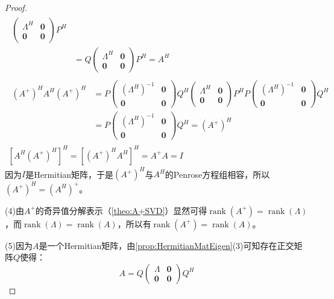 \begin{proof}
\begin{gather*}
\begin{aligned}
\begin{pmatrix}
				\varLambda^H & \mathbf{0} \\
				\mathbf{0} & \mathbf{0}
			\end{pmatrix}
			P^H \\
			&=Q
			\begin{pmatrix}
				\varLambda^H & \mathbf{0} \\
				\mathbf{0} & \mathbf{0}
			\end{pmatrix}
			P^H
			=A^H
		\end{aligned} \\
		\begin{aligned}
			(A^+)^HA^H(A^+)^H
			&=P
			\begin{pmatrix}
				(\varLambda^H)^{-1} & \mathbf{0} \\
				\mathbf{0} & \mathbf{0}
			\end{pmatrix}
			Q^H\begin{pmatrix}
				\varLambda^H & \mathbf{0} \\
				\mathbf{0} & \mathbf{0}
			\end{pmatrix}
			P^HP
			\begin{pmatrix}
				(\varLambda^H)^{-1} & \mathbf{0} \\
				\mathbf{0} & \mathbf{0}
			\end{pmatrix}Q^H \\
			&=P
			\begin{pmatrix}
				(\varLambda^H)^{-1} & \mathbf{0} \\
				\mathbf{0} & \mathbf{0}
			\end{pmatrix}Q^H
			=(A^+)^H
		\end{aligned} \\
		[A^H(A^+)^H]^H=[(A^+)^HA^H]^H=A^+A=I
	\end{gather*}
	因为$I$是Hermitian矩阵，于是$(A^+)^H$与$A^H$的Penrose方程组相容，所以$(A^+)^H=(A^H)^+$。\par
	(4)由$A^+$的奇异值分解表示（\cref{theo:A+SVD}）显然可得$\operatorname{rank}(A^+)=\operatorname{rank}(\varLambda)$，而$\operatorname{rank}(\varLambda)=\operatorname{rank}(A)$，所以有$\operatorname{rank}(A^+)=\operatorname{rank}(A)$。\par
	(5)因为$A$是一个Hermitian矩阵，由\cref{prop:HermitianMatEigen}(3)可知存在正交矩阵$Q$使得：
	\begin{equation*}
		A=Q
		\begin{pmatrix}
			\varLambda & \mathbf{0} \\
			\mathbf{0} & \mathbf{0}
		\end{pmatrix}Q^H
	\end{equation*}

\end{proof}
